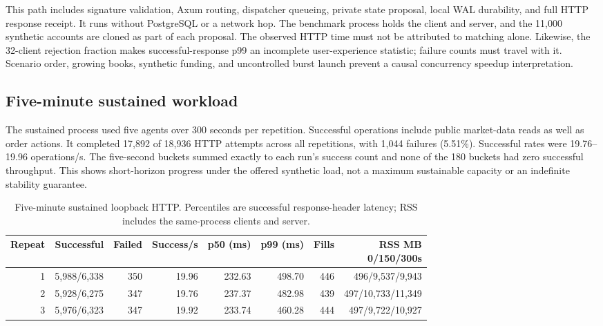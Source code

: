 \documentclass[envcountsame,runningheads,notitlepage]{llncs}
\begin{document}
This path includes signature validation, Axum routing, dispatcher queueing, private state proposal, local WAL durability, and full HTTP response receipt. It runs without PostgreSQL or a network hop. The benchmark process holds the client and server, and the 11,000 synthetic accounts are cloned as part of each proposal. The observed HTTP time must not be attributed to matching alone. Likewise, the 32-client rejection fraction makes successful-response p99 an incomplete user-experience statistic; failure counts must travel with it. Scenario order, growing books, synthetic funding, and uncontrolled burst launch prevent a causal concurrency speedup interpretation.

\subsection{Five-minute sustained workload}
The sustained process used five agents over 300 seconds per repetition. Successful operations include public market-data reads as well as order actions. It completed 17,892 of 18,936 HTTP attempts across all repetitions, with 1,044 failures (5.51\%). Successful rates were 19.76--19.96 operations/s. The five-second buckets summed exactly to each run's success count and none of the 180 buckets had zero successful throughput. This shows short-horizon progress under the offered synthetic load, not a maximum sustainable capacity or an indefinite stability guarantee.\cite{benchdata}

\begin{table}[h]
\centering\small
\begin{tabular*}{\linewidth}{@{\extracolsep{\fill}}rrrrrrrr}
\toprule
Repeat & Successful & Failed & Success/s & p50 (ms) & p99 (ms) & Fills & \shortstack{RSS MB\\0/150/300s} \\
\midrule
1 & 5,988/6,338 & 350 & 19.96 & 232.63 & 498.70 & 446 & 496/9,537/9,943 \\
2 & 5,928/6,275 & 347 & 19.76 & 237.37 & 482.98 & 439 & 497/10,733/11,349 \\
3 & 5,976/6,323 & 347 & 19.92 & 233.74 & 460.28 & 444 & 497/9,722/10,927 \\
\bottomrule
\end{tabular*}
\caption{Five-minute sustained loopback HTTP. Percentiles are successful response-header latency; RSS includes the same-process clients and server.}\label{tab:sustained-results}
\end{table}
\end{document}
